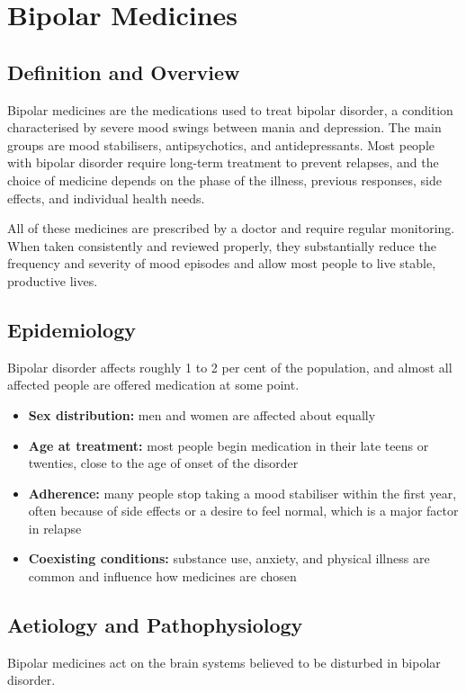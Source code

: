 \chapter{Bipolar Medicines}

\section*{Definition and Overview}
Bipolar medicines are the medications used to treat bipolar disorder, a condition characterised by severe mood swings between mania and depression. The main groups are mood stabilisers, antipsychotics, and antidepressants. Most people with bipolar disorder require long-term treatment to prevent relapses, and the choice of medicine depends on the phase of the illness, previous responses, side effects, and individual health needs.

All of these medicines are prescribed by a doctor and require regular monitoring. When taken consistently and reviewed properly, they substantially reduce the frequency and severity of mood episodes and allow most people to live stable, productive lives.

\section*{Epidemiology}
Bipolar disorder affects roughly 1 to 2 per cent of the population, and almost all affected people are offered medication at some point.

\begin{itemize}
    \item \textbf{Sex distribution:} men and women are affected about equally
    \item \textbf{Age at treatment:} most people begin medication in their late teens or twenties, close to the age of onset of the disorder
    \item \textbf{Adherence:} many people stop taking a mood stabiliser within the first year, often because of side effects or a desire to feel normal, which is a major factor in relapse
    \item \textbf{Coexisting conditions:} substance use, anxiety, and physical illness are common and influence how medicines are chosen
\end{itemize}

\section*{Aetiology and Pathophysiology}
Bipolar medicines act on the brain systems believed to be disturbed in bipolar disorder.

